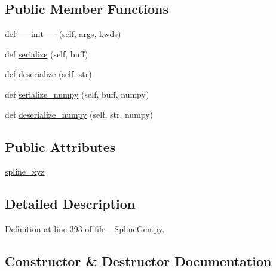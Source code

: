 \subsection*{Public Member Functions}
\begin{DoxyCompactItemize}
\item 
def \hyperlink{classtraj__gen_1_1srv_1_1___spline_gen_1_1_spline_gen_response_a74fd0fc37a79be98eecc5cf927c0c6fc}{\+\_\+\+\_\+init\+\_\+\+\_\+} (self, args, kwds)
\item 
def \hyperlink{classtraj__gen_1_1srv_1_1___spline_gen_1_1_spline_gen_response_aebf25ee8cf425a1ca81e2697c38c6f94}{serialize} (self, buff)
\item 
def \hyperlink{classtraj__gen_1_1srv_1_1___spline_gen_1_1_spline_gen_response_a98fb6565f869bcc2d7a4bf8802dfcd11}{deserialize} (self, str)
\item 
def \hyperlink{classtraj__gen_1_1srv_1_1___spline_gen_1_1_spline_gen_response_ac1b44088e80bd166dec65ba4837b8bf4}{serialize\+\_\+numpy} (self, buff, numpy)
\item 
def \hyperlink{classtraj__gen_1_1srv_1_1___spline_gen_1_1_spline_gen_response_aa0027af36d1c424c2dcb438a5d0470c5}{deserialize\+\_\+numpy} (self, str, numpy)
\end{DoxyCompactItemize}
\subsection*{Public Attributes}
\begin{DoxyCompactItemize}
\item 
\hyperlink{classtraj__gen_1_1srv_1_1___spline_gen_1_1_spline_gen_response_a4141e08f95bf878cf9d00d1fcf9254f2}{spline\+\_\+xyz}
\end{DoxyCompactItemize}


\subsection{Detailed Description}


Definition at line 393 of file \+\_\+\+Spline\+Gen.\+py.



\subsection{Constructor \& Destructor Documentation}
